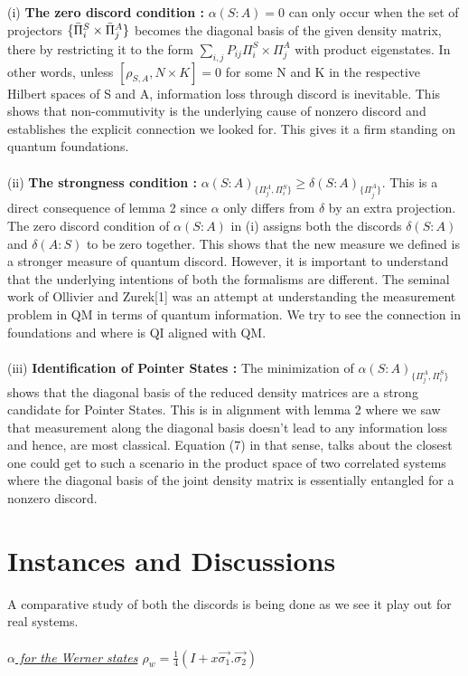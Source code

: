 \documentclass[8pt]{article}
\begin{document}
(i) \textbf{The zero discord condition :} $\alpha(S:A)=0$ can only occur when the set of projectors ${\{\Bar{{\Pi}}^{S}_{i} \times \Bar{{\Pi}}^{A}_{j}\}}$ becomes the diagonal basis of the given density matrix, there by restricting it to the form $\sum_{i,j}P_{ij}{{\Pi}}^{S}_{i}\times\Pi^{A}_{j}$ with product eigenstates. In other words, unless $[\rho_{\scriptscriptstyle{{S,A}}},N \times K]=0$ for some N and K in the respective Hilbert spaces of S and A, information loss through discord is inevitable. This shows that non-commutivity is the underlying cause of nonzero discord and establishes the explicit connection we looked for. This gives it a firm standing on quantum foundations.\\
\\
(ii) \textbf{The strongness condition :} $\alpha(S:A)_{\{{{\Pi}}^{A}_{j},{{\Pi}}^{S}_{i}\}} \geq \delta(S:A)_{{\{{\Pi}}^{A}_{j}\}}$. This is a direct consequence of lemma 2 since $\alpha$ only differs from $\delta$ by an extra projection. The zero discord condition of $\alpha(S:A)$ in (i) assigns both the discords $\delta(S:A)$ and $\delta(A:S)$ to be zero together. This shows that the new measure we defined is a stronger measure of quantum discord. However, it is important to understand that the underlying intentions of both the formalisms are different. The seminal work of Ollivier and Zurek[1] was an attempt at understanding the measurement problem in QM in terms of quantum information. We try to see the connection in foundations and where is QI aligned with QM.\\
\\
(iii) \textbf{Identification of Pointer States :} The minimization of $\alpha(S:A)_{\{{\Pi}^{A}_{j},{\Pi}^{S}_{i}\}}$ shows that the diagonal basis of the reduced density matrices are a strong candidate for Pointer States. This is in alignment with lemma 2 where we saw that measurement along the diagonal basis doesn't lead to any information loss and hence, are most classical. Equation (7) in that sense, talks about the closest one could get to such a scenario in the product space of two correlated systems where the diagonal basis of the joint density matrix is essentially entangled for a nonzero discord. 

\section{Instances and Discussions} 
A comparative study of both the discords is being done as we see it play out for real systems.\\
\\
{\textit{\underline{$\alpha$ for the Werner states} \textbf{$\rho_{w}= \frac{1}{4}(I + x\Vec{\sigma_{1}}.\Vec{\sigma_{2}})$}}}
\end{document}
